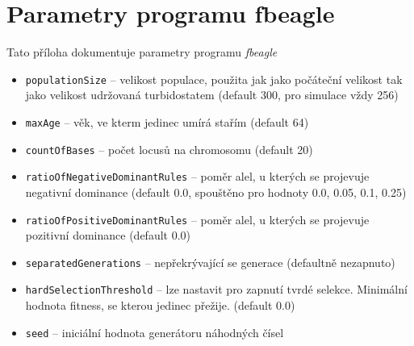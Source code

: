 \section{Parametry programu fbeagle}
\label{sec:parameters}

Tato příloha dokumentuje parametry programu \textit{fbeagle}

\begin{itemize}
  \item \texttt{\-\-populationSize} -- velikost populace, použita jak jako počáteční velikost tak jako velikost udržovaná turbidostatem (default 300, pro simulace vždy 256)
  \item \texttt{\-\-maxAge} -- věk, ve kterm jedinec umírá stařím (default 64)
  \item \texttt{\-\-countOfBases} -- počet locusů na chromosomu (default 20)
  \item \texttt{\-\-ratioOfNegativeDominantRules} -- poměr alel, u kterých se projevuje negativní dominance (default 0.0, spouštěno pro hodnoty 0.0, 0.05, 0.1, 0.25)
  \item \texttt{\-\-ratioOfPositiveDominantRules} -- poměr alel, u kterých se projevuje pozitivní dominance (default 0.0)
  \item \texttt{\-\-separatedGenerations} -- nepřekrývající se generace (defaultně nezapnuto)
  \item \texttt{\-\-hardSelectionThreshold} -- lze nastavit pro zapnutí tvrdé selekce. Minimální hodnota fitness, se kterou jedinec přežije. (default 0.0)
  \item \texttt{\-\-seed} -- iniciální hodnota generátoru náhodných čísel
\end{itemize}
